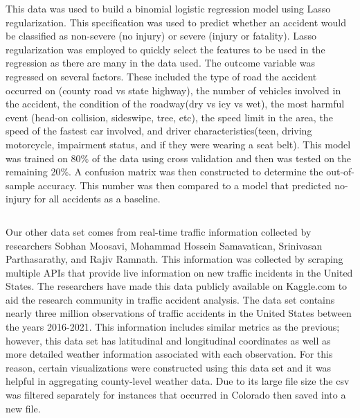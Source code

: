 \documentclass[
]{article}
\begin{document}
\begin{verbatim}
\end{verbatim}

This data was used to build a binomial logistic regression model using
Lasso regularization. This specification was used to predict whether an
accident would be classified as non-severe (no injury) or severe (injury
or fatality). Lasso regularization was employed to quickly select the
features to be used in the regression as there are many in the data
used. The outcome variable was regressed on several factors. These
included the type of road the accident occurred on (county road vs state
highway), the number of vehicles involved in the accident, the condition
of the roadway(dry vs icy vs wet), the most harmful event (head-on
collision, sideswipe, tree, etc), the speed limit in the area, the speed
of the fastest car involved, and driver characteristics(teen, driving
motorcycle, impairment status, and if they were wearing a seat belt).
This model was trained on 80\% of the data using cross validation and
then was tested on the remaining 20\%. A confusion matrix was then
constructed to determine the out-of-sample accuracy. This number was
then compared to a model that predicted no-injury for all accidents as a
baseline.

\begin{verbatim}
\end{verbatim}

Our other data set comes from real-time traffic information collected by
researchers Sobhan Moosavi, Mohammad Hossein Samavatican, Srinivasan
Parthasarathy, and Rajiv Ramnath. This information was collected by
scraping multiple APIs that provide live information on new traffic
incidents in the United States. The researchers have made this data
publicly available on Kaggle.com to aid the research community in
traffic accident analysis. The data set contains nearly three million
observations of traffic accidents in the United States between the years
2016-2021. This information includes similar metrics as the previous;
however, this data set has latitudinal and longitudinal coordinates as
well as more detailed weather information associated with each
observation. For this reason, certain visualizations were constructed
using this data set and it was helpful in aggregating county-level
weather data. Due to its large file size the csv was filtered separately
for instances that occurred in Colorado then saved into a new file.

\begin{verbatim}
\end{verbatim}
\end{document}
